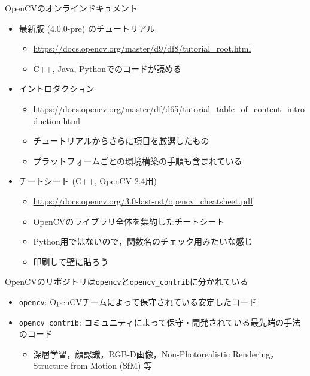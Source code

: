 \documentclass[10pt]{beamer}
\begin{document}
	\begin{frame}{OpenCVのオンラインドキュメント}
	    \begin{itemize}
	        \item 最新版 (4.0.0-pre) のチュートリアル
	            \begin{itemize}
	                \item \url{https://docs.opencv.org/master/d9/df8/tutorial_root.html}
	                \item C++, Java, Pythonでのコードが読める
	            \end{itemize}
	        \item イントロダクション
	            \begin{itemize}
	                \item \url{https://docs.opencv.org/master/df/d65/tutorial_table_of_content_introduction.html}
	                \item チュートリアルからさらに項目を厳選したもの
	                \item プラットフォームごとの環境構築の手順も含まれている
	            \end{itemize}
	        \item チートシート (C++, OpenCV 2.4用)
	            \begin{itemize}
	                \item \url{https://docs.opencv.org/3.0-last-rst/opencv_cheatsheet.pdf}
	                \item OpenCVのライブラリ全体を集約したチートシート
	                \item Python用ではないので，関数名のチェック用みたいな感じ
	                \item 印刷して壁に貼ろう
	            \end{itemize}
	    \end{itemize}
	\end{frame}
	
	\begin{frame}{OpenCVのリポジトリは\texttt{opencv}と\texttt{opencv\_contrib}に分かれている}
	    \begin{itemize}
	        \item \texttt{opencv}: OpenCVチームによって保守されている安定したコード
	        \item \texttt{opencv\_contrib}: コミュニティによって保守・開発されている最先端の手法のコード
	            \begin{itemize}
	                \item 深層学習，顔認識，RGB-D画像，Non-Photorealistic Rendering，Structure from Motion (SfM) 等
	            \end{itemize}
	    \end{itemize}
	\end{frame}
	
\end{document}

